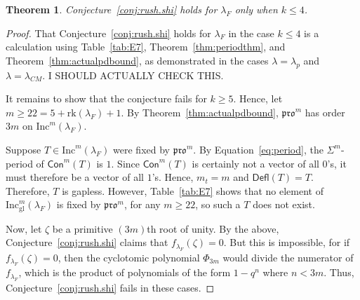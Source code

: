 \documentclass[12pt]{amsart}
\newtheorem{theorem}{Theorem}[section]
\theoremstyle{definition}
\theoremstyle{remark}
\numberwithin{equation}{section}
\newcommand{\inc}{\ensuremath{\mathrm{Inc}}}
\newcommand{\incgl}{\inc_{\mathrm{gl}}}
\newcommand{\pro}{\mathfrak{pro}}
\newcommand{\rank}{\ensuremath{\mathrm{rk}}}
\newcommand{\deflate}{\ensuremath{\mathsf{Defl}}}
\newcommand{\content}{\ensuremath{\mathsf{Con}}}
\begin{document}
\begin{theorem}\label{thm:F_bad}
Conjecture~\ref{conj:rush.shi} holds for $\lambda_F$ only when $k \leq 4$.
\end{theorem}
\begin{proof}
That Conjecture~\ref{conj:rush.shi} holds for $\lambda_F$ in the case $k \leq 4$ is a calculation using Table~\ref{tab:E7}, Theorem~\ref{thm:periodthm}, and Theorem~\ref{thm:actualpdbound}, as demonstrated in the cases $\lambda = \lambda_p$ and $\lambda = \lambda_{CM}$.  I SHOULD ACTUALLY CHECK THIS.

It remains to show that the conjecture fails for $k \geq 5$. Hence, let $m \geq 22 = 5 +  \rank(\lambda_F) + 1$. By Theorem~\ref{thm:actualpdbound}, $\pro^m$ has order $3m$ on $\inc^m(\lambda_F)$. 

Suppose $T \in \inc^m(\lambda_F)$ were fixed by $\pro^m$.  By Equation~\ref{eq:period}, the $\Sigma^m$-period of $\content^m(T)$ is $1$. Since $\content^m(T)$ is certainly not a vector of all $0$'s, it must therefore be a vector of all $1$'s. Hence, $m_t = m$ and $\deflate(T) = T$. Therefore, $T$ is gapless. However, Table~\ref{tab:E7} shows that no element of $\incgl^m(\lambda_F)$ is fixed by $\pro^m$, for any $m \geq 22$, so such a $T$ does not exist.


Now, let $\zeta$ be a primitive $(3m)$th root of unity. By the above, Conjecture~\ref{conj:rush.shi} claims that $f_{\lambda_F}(\zeta) = 0$. But this is impossible, for if $f_{\lambda_F}(\zeta) = 0$, then the cyclotomic polynomial $\Phi_{3m}$ would divide the numerator of $f_{\lambda_F}$, which is the product of polynomials of the form $1-q^n$ where $n < 3m$. Thus, Conjecture~\ref{conj:rush.shi} fails in these cases. 
\end{proof}
%
\end{document}
